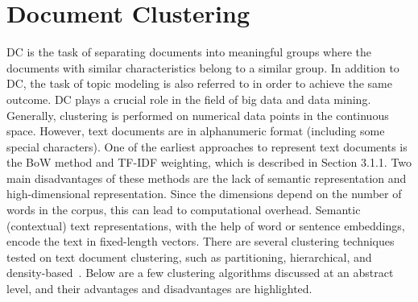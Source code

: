 \section{Document Clustering}

\ac{DC} is the task of separating documents into meaningful groups where the documents with similar characteristics belong to a similar group. In addition to \ac{DC}, the task of topic modeling is also referred to in order to achieve the same outcome. \ac{DC} plays a crucial role in the field of big data and data mining. Generally, clustering is performed on numerical data points in the continuous space. However, text documents are in alphanumeric format (including some special characters). One of the earliest approaches to represent text documents is the \ac{BoW} method and \ac{TF-IDF} weighting, which is described in Section 3.1.1. Two main disadvantages of these methods are the lack of semantic representation and high-dimensional representation. Since the dimensions depend on the number of words in the corpus, this can lead to computational overhead. Semantic (contextual) text representations, with the help of word or sentence embeddings, encode the text in fixed-length vectors. There are several clustering techniques tested on text document clustering, such as partitioning, hierarchical, and density-based~\cite{afzali2019text}. Below are a few clustering algorithms discussed at an abstract level, and their advantages and disadvantages are highlighted.


